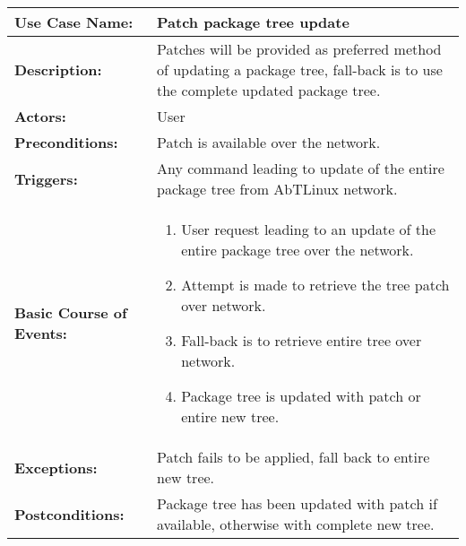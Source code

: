 
\begin{tabularx}{\linewidth}{|l|X|}
\hline
\textbf{Use Case Name:} & \textbf{Patch package tree update} \\
\hline
\textbf{Description:} & 
Patches will be provided as preferred method of updating a package tree, fall-back
is to use the complete updated package tree. \\
\hline
\textbf{Actors:} & User \\
\hline
\textbf{Preconditions:} & 
Patch is available over the network. \\
\hline
\textbf{Triggers:} & Any command leading to update of the entire package tree from AbTLinux network.  \\
\hline
\textbf{Basic Course of Events:} & 
\begin{minipage}{\linewidth} 
  \vspace{0.05em}
  \begin{enumerate}
    \item User request leading to an update of the entire package tree over the network.
    \item Attempt is made to retrieve the tree patch over network.
    \item Fall-back is to retrieve entire tree over network.
    \item Package tree is updated with patch or entire new tree.
  \end{enumerate}
  \vspace{0.05em}
\end{minipage}
\\
\hline
\textbf{Exceptions:} & 
Patch fails to be applied, fall back to entire new tree. \\
\hline 
\textbf{Postconditions:} &
Package tree has been updated with patch if available, otherwise with complete new tree.
\\
\hline
\end{tabularx}


